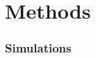 \documentclass[fleqn,usenatbib]{mnras}
\begin{document}






\section{Methods}
\label{s: methods}

\subsubsection{Simulations}
\label{s: methods -- simulations}
\end{document}
